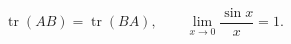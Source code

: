 \documentclass{article}
\DeclareMathOperator{\tr}{tr}
\begin{document}
\[
  \tr(AB) = \tr(BA), \qquad \lim_{x\to 0}\frac{\sin x}{x} = 1.
\]
\end{document}
